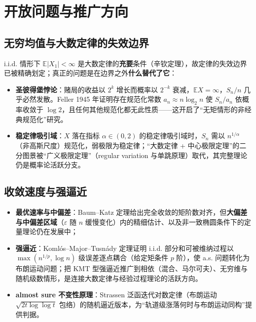 \section{开放问题与推广方向}\label{sec:open_problems}

\subsection{无穷均值与大数定律的失效边界}

i.i.d. 情形下 $\mathbb{E}|X_1| < \infty$ 是大数定律的\textbf{充要}条件（辛钦定理），故定律的失效边界已被精确划定；真正的问题是在边界之外\textbf{什么替代了它}：

\begin{itemize}
    \item \textbf{圣彼得堡悖论}：赌局的收益以 $2^k$ 增长而概率以 $2^{-k}$ 衰减，$\mathbb{E}X = \infty$，$S_n/n$ 几乎必然发散。Feller 1945 年\cite{feller1945}证明存在规范化常数 $a_n \approx n\log_2 n$ 使 $S_n/a_n$ 依概率收敛于 $\log 2$，且任何其他规范化都无此性质——这开启了“无矩情形的非经典规范化”研究。
    \item \textbf{稳定律吸引域}：$X$ 落在指标 $\alpha \in (0, 2)$ 的稳定律吸引域时，$S_n$ 需以 $n^{1/\alpha}$（非高斯尺度）规范化，弱极限为稳定律；“大数定律 + 中心极限定理”的二分图景被“广义极限定理”（regular variation 与单跳原理）取代，其完整理论仍是概率论活跃分支。
\end{itemize}

\subsection{收敛速度与强逼近}

\begin{itemize}
    \item \textbf{最优速率与中偏差}：Baum--Katz 定理给出完全收敛的矩阶数对齐，但\textbf{大偏差与中偏差区域}（$\varepsilon$ 随 $n$ 缓慢变化）内的精细估计、以及非一致椭圆条件下的定量理论仍在发展中；
    \item \textbf{强逼近}：Koml\'os--Major--Tusn\'ady 定理\cite{kmt1975}证明 i.i.d. 部分和可被维纳过程以 $\max(n^{1/p}, \log n)$ 级误差逐点耦合（给定矩条件 $p$ 阶），使 a.s. 问题转化为布朗运动问题；把 KMT 型强逼近推广到相依（混合、马尔可夫）、无穷维与随机级数情形，是连接大数定律与经验过程理论的活跃方向。
    \item \textbf{almost sure 不变性原理}：Strassen 泛函迭代对数定律（布朗运动 $\sqrt{2t\log\log t}$ 包络）的随机逼近版本，为“轨道级涨落何时与布朗运动同构”提供判据。
\end{itemize}

